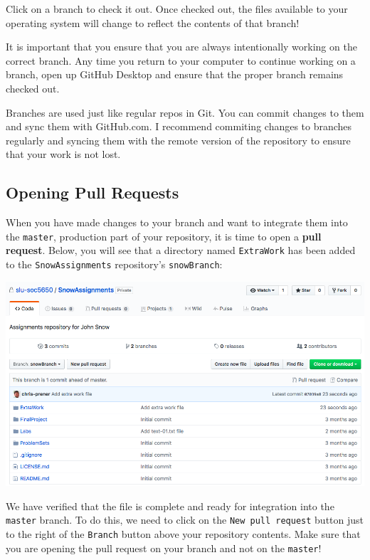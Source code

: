 \documentclass[]{book}
\theoremstyle{definition}
\theoremstyle{definition}
\theoremstyle{definition}
\theoremstyle{remark}
\begin{document}
Click on a branch to check it out. Once checked out, the files available
to your operating system will change to reflect the contents of that
branch!

It is important that you ensure that you are always intentionally
working on the correct branch. Any time you return to your computer to
continue working on a branch, open up GitHub Desktop and ensure that the
proper branch remains checked out.

Branches are used just like regular repos in Git. You can commit changes
to them and sync them with GitHub.com. I recommend commiting changes to
branches regularly and syncing them with the remote version of the
repository to ensure that your work is not lost.

\subsection{Opening Pull Requests}\label{opening-pull-requests}

When you have made changes to your branch and want to integrate them
into the \texttt{master}, production part of your repository, it is time
to open a \textbf{pull request}. Below, you will see that a directory
named \texttt{ExtraWork} has been added to the \texttt{SnowAssignments}
repository's \texttt{snowBranch}:

\includegraphics[width=1\linewidth]{images/branch4}

We have verified that the file is complete and ready for integration
into the \texttt{master} branch. To do this, we need to click on the
\texttt{New\ pull\ request} button just to the right of the
\texttt{Branch} button above your repository contents. Make sure that
you are opening the pull request on your branch and not on the
\texttt{master}!
\end{document}
